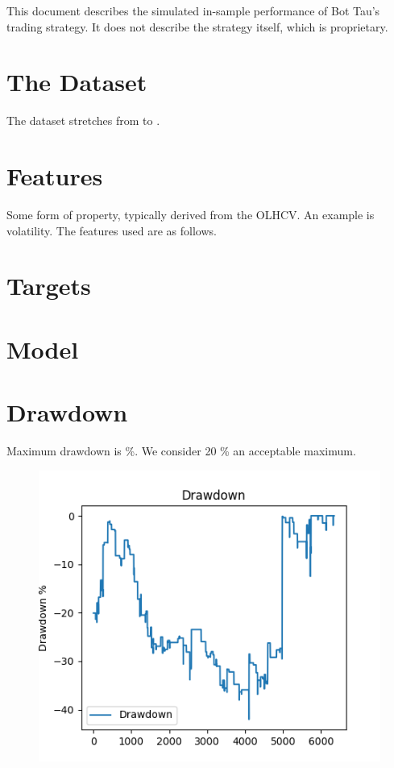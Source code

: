 \documentclass[a4paper]{article}
\title{\documenttitle}
\date{\today}
\author{Frans Englich \\
        \href{mailto:fenglich@fastmail.fm}{fenglich@fastmail.fm}}
\begin{document}
\maketitle

This document describes the simulated in-sample performance of Bot Tau's trading
strategy. It does not describe the strategy itself, which is proprietary.

\section{The Dataset}

The dataset stretches from \constantStartdate to \constantEnddate.

\section{Features}

Some form of property, typically derived from the OLHCV. An example is
volatility. The features used are as follows.

\section{Targets}

\section{Model}

\section{Drawdown}

Maximum drawdown is \constantMaxdrawdown \%. We consider 20 \% an acceptable maximum.

\begin{figure}[H]
    \begin{center}
        \includegraphics{../generated/drawdown.png}
    \end{center}
\end{figure}
\end{document}

